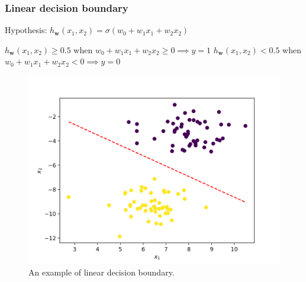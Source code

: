 \documentclass{beamer}
\begin{document}
	\begin{frame}
		\frametitle{Linear decision boundary}
		Hypothesis: $h_{\bm{w}}(x_1, x_2) = \sigma(w_0 + w_1 x_1 + w_2 x_2)$
		
		\vspace{2mm}
		
		$h_{\bm{w}}(x_1, x_2) \geq 0.5$ when $w_0 + w_1 x_1 + w_2 x_2 \geq 0 \implies y = 1$
		$h_{\bm{w}}(x_1, x_2) < 0.5$ when $w_0 + w_1 x_1 + w_2 x_2 < 0 \implies y = 0$
		
		\begin{figure}
			\centering
			\includegraphics[scale=0.5]{images/linear_decision_boundary}
			\caption{An example of linear decision boundary.}
		\end{figure}
	\end{frame}
\end{document}
